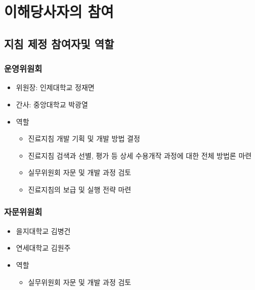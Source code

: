 \documentclass[]{book}
\providecommand{\tightlist}{%
  \setlength{\itemsep}{0pt}\setlength{\parskip}{0pt}}
\begin{document}
\hypertarget{section-29}{%
\section{이해당사자의 참여}\label{section-29}}

\hypertarget{section-30}{%
\subsection{지침 제정 참여자및 역할}\label{section-30}}

\hypertarget{section-31}{%
\subsubsection*{운영위원회}\label{section-31}}

\begin{itemize}
\item
  위원장: 인제대학교 정재면
\item
  간사: 중앙대학교 박광열
\item
  역할

  \begin{itemize}
  \tightlist
  \item
    진료지침 개발 기획 및 개발 방법 결정
  \item
    진료지침 검색과 선별, 평가 등 상세 수용개작 과정에 대한 전체 방법론 마련
  \item
    실무위원회 자문 및 개발 과정 검토
  \item
    진료지침의 보급 및 실행 전략 마련
  \end{itemize}
\end{itemize}

\hypertarget{section-32}{%
\subsubsection*{자문위원회}\label{section-32}}

\begin{itemize}
\item
  을지대학교 김병건
\item
  연세대학교 김원주
\item
  역할

  \begin{itemize}
  \tightlist
  \item
    실무위원회 자문 및 개발 과정 검토
  \end{itemize}
\end{itemize}
\end{document}
